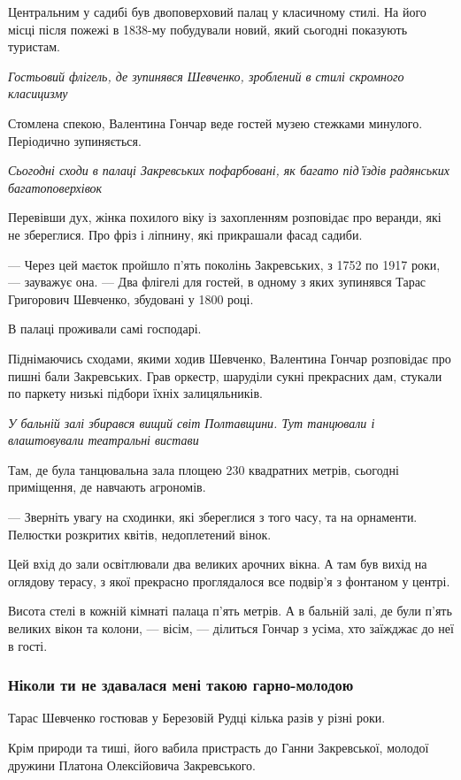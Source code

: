 Центральним у садибі був двоповерховий палац у класичному стилі. На його місці після пожежі в 1838-му побудували новий, який сьогодні показують туристам.

\emph{Гостьовий флігель, де зупинявся Шевченко, зроблений в стилі скромного класицизму}

Стомлена спекою, Валентина Гончар веде гостей музею стежками минулого. Періодично зупиняється.

\emph{Сьогодні сходи в палаці Закревських пофарбовані, як багато під'їздів радянських багатоповерхівок}

Перевівши дух, жінка похилого віку із захопленням розповідає про веранди, які
не збереглися. Про фріз і ліпнину, які прикрашали фасад садиби.

--- Через цей маєток пройшло п’ять поколінь Закревських, з 1752 по 1917 роки, ---
зауважує она. --- Два флігелі для гостей, в одному з яких зупинявся Тарас
Григорович Шевченко, збудовані у 1800 році.

В палаці проживали самі господарі.

Піднімаючись сходами, якими ходив Шевченко, Валентина Гончар розповідає про
пишні бали Закревських. Грав оркестр, шаруділи сукні прекрасних дам, стукали по
паркету низькі підбори їхніх залицяльників.

\emph{У бальній залі збирався вищий світ Полтавщини. Тут танцювали і влаштовували театральні вистави}

Там, де була танцювальна зала площею 230 квадратних метрів, сьогодні приміщення, де навчають агрономів.

--- Зверніть увагу на сходинки, які збереглися з того часу, та на орнаменти.
Пелюстки розкритих квітів, недоплетений вінок. 

Цей вхід до зали освітлювали два великих арочних вікна. А там був вихід на
оглядову терасу, з якої прекрасно проглядалося все подвір’я з фонтаном у
центрі.

Висота стелі в кожній кімнаті палаца п’ять метрів. А в бальній залі, де були
п’ять великих вікон та колони, --- вісім, --- ділиться Гончар з усіма, хто заїжджає
до неї в гості.

\subsubsection{Ніколи ти не здавалася мені такою гарно-молодою}

Тарас Шевченко гостював у Березовій Рудці кілька разів у різні роки.

Крім природи та тиші, його вабила пристрасть до Ганни Закревської, молодої
дружини Платона Олексійовича Закревського.


